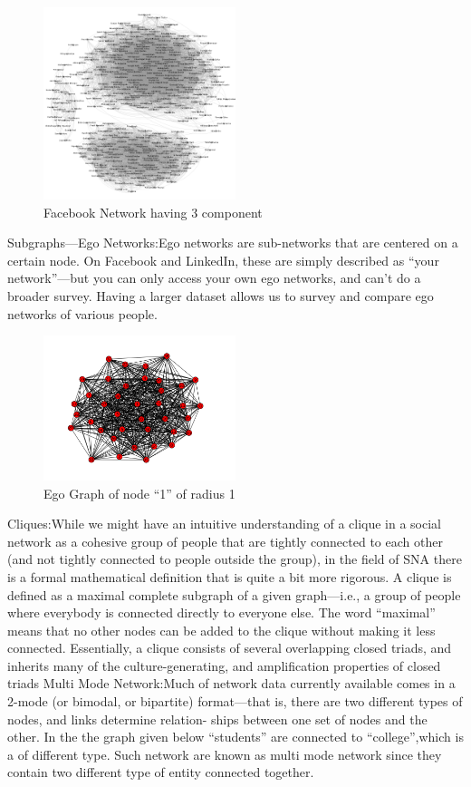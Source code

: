 \documentclass[AER]{AEA}
\begin{document}
\begin{figure}[h]
\caption{Facebook Network having 3 component}
\centering
\includegraphics[width=0.5\textwidth]{component}
\end{figure}

Subgraphs—Ego Networks:Ego networks are sub-networks that are centered on a certain node. On Facebook and 
LinkedIn, these are simply described as “your network”—but you can only access your 
own ego networks, and can’t do a broader survey. Having a larger dataset allows us to 
survey and compare ego networks of various people. 


\begin{figure}[h]
\caption{Ego Graph of node “1” of radius 1}
\centering
\includegraphics[width=0.5\textwidth]{ego_graph}
\end{figure}

Cliques:While we might have an intuitive understanding of a clique in a social network as a cohesive group of people that are tightly connected to each other (and not tightly connected to people outside the group), in the field of SNA there is a formal mathematical definition that is quite a bit more rigorous. A clique is defined as a maximal complete subgraph of a given graph—i.e., a group of people where everybody is connected directly to everyone else. The word “maximal” means that no other nodes can be added to the clique without making it less connected. Essentially, a clique consists of several overlapping closed triads, and inherits many of the culture-generating, and amplification properties of closed triads 
Multi Mode Network:Much of network data currently available comes in a 2-mode (or bimodal, or bipartite) 
format—that is, there are two different types of nodes, and links determine relation- 
ships between one set of nodes and the other. 
In the the graph given below “students” are connected to “college”,which is a of different type.
Such network are known as multi mode network since they contain two different type of entity connected together.
\end{document}
